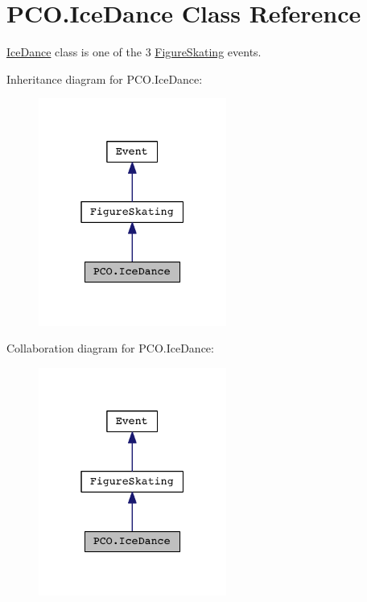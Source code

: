 \hypertarget{classPCO_1_1IceDance}{\section{P\+C\+O.\+Ice\+Dance Class Reference}
\label{classPCO_1_1IceDance}
}


\hyperlink{classPCO_1_1IceDance}{Ice\+Dance} class is one of the 3 \hyperlink{classPCO_1_1FigureSkating}{Figure\+Skating} events.  




Inheritance diagram for P\+C\+O.\+Ice\+Dance\+:\nopagebreak
\begin{figure}[H]
\begin{center}
\leavevmode
\includegraphics[width=175pt]{classPCO_1_1IceDance__inherit__graph}
\end{center}
\end{figure}


Collaboration diagram for P\+C\+O.\+Ice\+Dance\+:\nopagebreak
\begin{figure}[H]
\begin{center}
\leavevmode
\includegraphics[width=175pt]{classPCO_1_1IceDance__coll__graph}
\end{center}
\end{figure}
